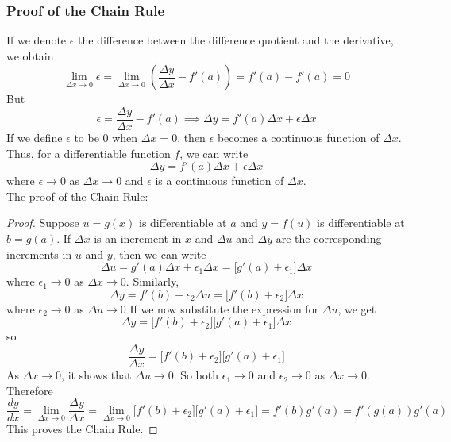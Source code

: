 \subsubsection*{Proof of the Chain Rule}
If we denote \(\epsilon\) the difference between the difference quotient and
the derivative, we obtain
\[\lim_{\Delta x\to 0}\epsilon
=\lim_{\Delta x\to 0}\left(\frac{\Delta y}{\Delta x}-f'(a)\right)
=f'(a)-f'(a)=0\]
But
\[\epsilon=\frac{\Delta y}{\Delta x}-f'(a)
\implies \Delta y=f'(a)\Delta x+\epsilon\Delta x\]
If we define \(\epsilon\) to be 0 when \(\Delta x=0\), then \(\epsilon\)
becomes a continuous function of \(\Delta x\).
Thus, for a differentiable function \(f\), we can write
\[\Delta y=f'(a)\Delta x+\epsilon\Delta x\]
where \(\epsilon\to 0\) as \(\Delta x\to 0\) and \(\epsilon\) is a continuous
function of \(\Delta x\). \\
The proof of the Chain Rule:
\begin{proof}
    Suppose \(u=g(x)\) is differentiable at \(a\) and \(y=f(u)\) is
    differentiable at \(b=g(a)\).
    If \(\Delta x\) is an increment in \(x\) and \(\Delta u\) and \(\Delta y\)
    are the corresponding increments in \(u\) and \(y\), then we can write
    \[\Delta u=g'(a)\Delta x+\epsilon_1\Delta x
    =\big[g'(a)+\epsilon_1\big]\Delta x\]
    where \(\epsilon_1\to 0\) as \(\Delta x\to 0\).
    Similarly,
    \[\Delta y=f'(b)+\epsilon_2\Delta u=\big[f'(b)+\epsilon_2\big]\Delta x\]
    where \(\epsilon_2\to 0\) as \(\Delta u\to 0\)
    If we now substitute the expression for \(\Delta u\), we get
    \[\Delta y=\big[f'(b)+\epsilon_2\big]\big[g'(a)+\epsilon_1\big]\Delta x\]
    so
    \[\frac{\Delta y}{\Delta x}
    =\big[f'(b)+\epsilon_2\big]\big[g'(a)+\epsilon_1\big]\]
    As \(\Delta x\to 0\), it shows that \(\Delta u\to 0\).
    So both \(\epsilon_1\to 0\) and \(\epsilon_2\to 0\) as \(\Delta x\to 0\).
    Therefore
    \[\frac{dy}{dx}=\lim_{\Delta x\to 0}\frac{\Delta y}{\Delta x}
    =\lim_{\Delta x\to 0}\big[f'(b)+\epsilon_2\big]\big[g'(a)+\epsilon_1\big]
    =f'(b)g'(a)=f'(g(a))g'(a)\]
    This proves the Chain Rule.
\end{proof}